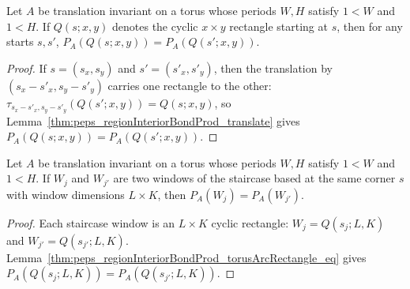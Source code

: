\begin{lemma}%
    \label{thm:peps_regionInteriorBondProd_torusArcRectangle_eq}
    \leanok
    Let $A$ be translation invariant on a torus whose periods $W,H$ satisfy
    $1<W$ and $1<H$. If $Q(s;x,y)$ denotes the cyclic $x\times y$ rectangle
    starting at $s$, then for any starts $s,s'$,
    $P_A(Q(s;x,y))=P_A(Q(s';x,y))$.
\end{lemma}
\begin{proof}
    \leanok
    If $s=(s_x,s_y)$ and $s'=(s'_x,s'_y)$, then the translation by
    $(s_x-s'_x,s_y-s'_y)$ carries one rectangle to the other:
    $\tau_{s_x-s'_x,s_y-s'_y}(Q(s';x,y))=Q(s;x,y)$,
    so Lemma~\ref{thm:peps_regionInteriorBondProd_translate} gives
    $P_A(Q(s;x,y))=P_A(Q(s';x,y))$.
\end{proof}

\begin{lemma}%
    \label{thm:peps_regionInteriorBondProd_staircaseWindow_eq}
    \leanok
    Let $A$ be translation invariant on a torus whose periods $W,H$ satisfy
    $1<W$ and $1<H$. If $W_j$ and $W_{j'}$ are two windows of the staircase
    based at the same corner $s$ with window dimensions $L\times K$, then
    $P_A(W_j)=P_A(W_{j'})$.
\end{lemma}
\begin{proof}
    \leanok
    Each staircase window is an $L\times K$ cyclic rectangle:
    $W_j=Q(s_j;L,K)$ and $W_{j'}=Q(s_{j'};L,K)$.
    Lemma~\ref{thm:peps_regionInteriorBondProd_torusArcRectangle_eq}
    gives $P_A(Q(s_j;L,K))=P_A(Q(s_{j'};L,K))$.
\end{proof}


